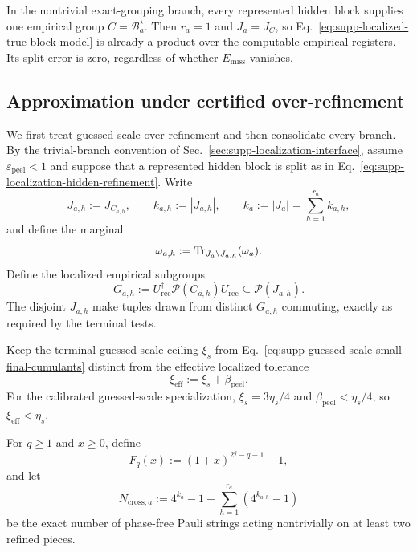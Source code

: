 \documentclass[
  aps,
  prx,
  reprint,
  superscriptaddress,
  amsmath,
  amssymb,
  nofootinbib,
  longbibliography
]{revtex4-2}
\newcommand{\Pc}{\mathcal{P}}
\begin{document}
In the nontrivial exact-grouping branch, every represented hidden block
supplies one empirical group $C=\mathcal B_a^\star$.  Then $r_a=1$ and
$J_a=J_C$, so Eq.~\eqref{eq:supp-localized-true-block-model} is already a
product over the computable empirical registers.  Its split error is zero,
regardless of whether $E_{\mathrm{miss}}$ vanishes.

\subsection{Approximation under certified over-refinement}
\label{sec:supp-certified-overrefinement-product}

We first treat guessed-scale over-refinement and then consolidate every
branch.  By the trivial-branch convention of
Sec.~\ref{sec:supp-localization-interface}, assume
$\varepsilon_{\mathrm{peel}}<1$ and suppose that a represented hidden block
is split as in
Eq.~\eqref{eq:supp-localization-hidden-refinement}.  Write
\begin{equation}
J_{a,h}:=J_{C_{a,h}},
\qquad
k_{a,h}:=|J_{a,h}|,
\qquad
k_a:=|J_a|=\sum_{h=1}^{r_a}k_{a,h},
\end{equation}
and define the marginal
\begin{equation}
\omega_{a,h}
:=
\Tr_{J_a\setminus J_{a,h}}(\omega_a).
\end{equation}
Define the localized empirical subgroups
\begin{equation}
G_{a,h}
:=
U_{\mathrm{rec}}^\dagger
\mathcal P(C_{a,h})
U_{\mathrm{rec}}
\subseteq
\Pc(J_{a,h}).
\label{eq:supp-localized-empirical-subgroups}
\end{equation}
The disjoint $J_{a,h}$ make tuples drawn from distinct $G_{a,h}$ commuting,
exactly as required by the terminal tests.

Keep the terminal guessed-scale ceiling $\xi_s$ from
Eq.~\eqref{eq:supp-guessed-scale-small-final-cumulants} distinct from the
effective localized tolerance
\begin{equation}
\xi_{\mathrm{eff}}
:=
\xi_s+\beta_{\mathrm{peel}}.
\label{eq:supp-effective-localized-cumulant-tolerance}
\end{equation}
For the calibrated guessed-scale specialization,
$\xi_s=3\eta_s/4$ and
$\beta_{\mathrm{peel}}<\eta_s/4$, so
$\xi_{\mathrm{eff}}<\eta_s$.

For $q\ge1$ and $x\ge0$, define
\begin{equation}
F_q(x):=(1+x)^{2^q-q-1}-1,
\label{eq:supp-split-cumulant-factor}
\end{equation}
and let
\begin{equation}
N_{\mathrm{cross},a}
:=4^{k_a}-1-\sum_{h=1}^{r_a}(4^{k_{a,h}}-1)
\label{eq:supp-split-cross-pauli-count}
\end{equation}
be the exact number of phase-free Pauli strings acting nontrivially on at
least two refined pieces.
\end{document}
